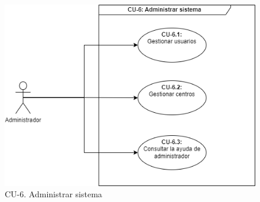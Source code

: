\begin{figure}[H]
        \centering
        \includegraphics[scale=0.55]{img/diagramas/Funcional/CU-6.png}
        \caption{CU-6. Administrar sistema}
        \label{fig:Diagrama-Caso de uso 6. Administrar sistema}
\end{figure}

